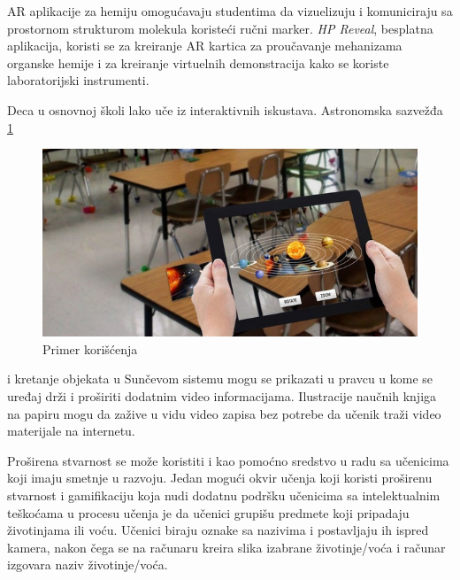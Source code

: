 \documentclass[a4paper]{article}
\begin{document}
	AR aplikacije za hemiju omogućavaju studentima da vizuelizuju i komuniciraju sa prostornom strukturom molekula koristeći ručni marker. \emph{HP Reveal}, besplatna aplikacija, koristi 
	se za kreiranje AR kartica za proučavanje mehanizama organske hemije i za kreiranje virtuelnih demonstracija kako se koriste laboratorijski instrumenti.

	Deca u osnovnoj školi lako uče iz interaktivnih iskustava. Astronomska sazvežđa \ref{fig:Primer korišćenja} 
	\begin{figure}[h!]
		\begin{center}
		\includegraphics[scale=0.5]{primerkorišćenja.jpg}
		\end{center}
		\caption{Primer korišćenja}
		\label{fig:Primer korišćenja}
		\end{figure}
	i kretanje objekata u Sunčevom sistemu mogu se prikazati u pravcu u kome se uređaj drži
	i proširiti dodatnim video informacijama. Ilustracije naučnih knjiga na papiru mogu da zažive u vidu video zapisa bez potrebe da učenik traži video materijale na internetu.

	Proširena stvarnost se može koristiti i kao pomoćno sredstvo u radu sa učenicima koji imaju smetnje u razvoju. Jedan mogući okvir učenja koji koristi proširenu stvarnost 
	i gamifikaciju koja nudi dodatnu podršku učenicima sa intelektualnim teškoćama u procesu učenja je da učenici grupišu predmete koji pripadaju životinjama ili voću. 
	Učenici biraju oznake sa nazivima i postavljaju ih ispred kamera, nakon čega se na računaru kreira slika izabrane životinje/voća i računar izgovara naziv životinje/voća.
\end{document}

